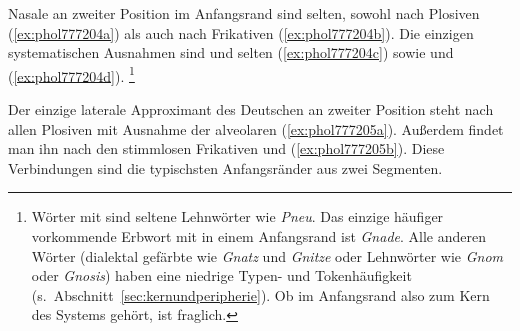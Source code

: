 \begin{exe}
  \ex\label{ex:phol777203}
  \begin{xlist}
  \end{xlist}
\end{exe}

Nasale an zweiter Position im Anfangsrand sind selten, sowohl nach Plosiven (\ref{ex:phol777204a}) als auch nach Frikativen (\ref{ex:phol777204b}).
Die einzigen systematischen Ausnahmen sind \textipa{[kn]} und selten \textipa{[gn]} (\ref{ex:phol777204c}) sowie \textipa{[Sn]} und \textipa{[Sm]} (\ref{ex:phol777204d}).%
\footnote{Wörter mit \textipa{[pn]} sind seltene Lehnwörter wie \textit{Pneu}.
Das einzige häufiger vorkommende Erbwort mit \textipa{[gn]} in einem Anfangsrand ist \textit{Gnade}.
Alle anderen Wörter (\zB dialektal gefärbte wie \textit{Gnatz} und \textit{Gnitze} oder Lehnwörter wie \textit{Gnom} oder \textit{Gnosis}) haben eine niedrige Typen- und Tokenhäufigkeit (s.\ Abschnitt~\ref{sec:kernundperipherie}).
Ob \textipa{[gn]} im Anfangsrand also zum Kern des Systems gehört, ist fraglich.}

\begin{exe}
  \ex\label{ex:phol777204}
  \begin{xlist}
  \end{xlist}
\end{exe}

Der einzige laterale Approximant des Deutschen \textipa{[l]} an zweiter Position steht nach allen Plosiven mit Ausnahme der alveolaren (\ref{ex:phol777205a}).
Außerdem findet man ihn nach den stimmlosen Frikativen \textipa{[f]} und \textipa{[S]} (\ref{ex:phol777205b}).
Diese Verbindungen sind die typischsten Anfangsränder aus zwei Segmenten.

\begin{exe}
  \ex\label{ex:phol777205}
  \begin{xlist}
  \end{xlist}
\end{exe}

